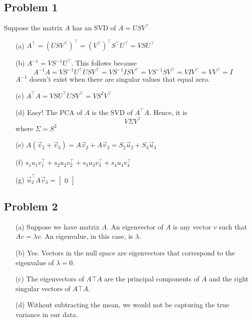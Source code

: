 \documentclass[11pt]{article}
\begin{document}
\subsection*{Problem 1}
Suppose the matrix $A$ has an SVD of $A=USV^\top$
\begin{enumerate}
    \item[(a)] $A^\top=\left(USV^\top\right)^\top=\left(V^\top\right)^\top S^\top U^\top = V S U^\top$
    \item[(b)] $A^{-1}=VS^{-1}U^\top$. This follows because \[ A^{-1}A = VS^{-1}U^\top USV^\top=VS^{-1}ISV^\top = VS^{-1}SV^\top = VIV^\top= VV^\top=I\] $A^{-1}$ doesn't exist when there are singular values that equal zero.
    \item[(c)] $A^\top A=V S U^\top USV^\top=VS^{2}V^\top$
    \item[(d)] Easy! The PCA of $A$ is the SVD of $A^\top A$. Hence, it is \[ V\Sigma V^\top \] where $\Sigma=S^2$
    \item[(e)] $A\left(\vec{v}_2+\vec{v}_3\right)= A\vec{v}_2 + A\vec{v}_3=S_2\vec{u}_2 + S_3\vec{u}_3$
    \item[(f)] $s_1 u_1v_1^\top + s_2 u_2v_2^\top +s_3 u_3v_3^\top +s_4 u_4v_4^\top$
    \item[(g)] $\vec{u}^\top_2A\vec{v}_3= \begin{bmatrix} 0 \end{bmatrix}$
\end{enumerate}

\subsection*{Problem 2}
\begin{enumerate}
    \item[(a)] Suppose we have matrix $A$. An eigenvector of $A$ is any vector $v$ such that $Av=\lambda v$. An eigenvalue, in this case, is $\lambda$.
    \item[(b)] Yes. Vectors in the null space are eigenvectors that correspond to the eigenvalue of $\lambda=0$.
    \item[(c)] The eigenvectors of $A\top A$ are the principal components of $A$ and the right singular vectors of $A\top A$.
    \item[(d)] Without subtracting the mean, we would not be capturing the true variance in our data.
\end{enumerate}
\end{document}
